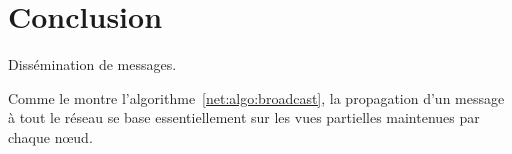 
\section{Conclusion}
\label{net:sec:conclusionspray}

\begin{algorithm}[h]
  
  \caption{\label{net:algo:broadcast} Dissémination de messages.}
\end{algorithm}

Comme le montre l'algorithme~\ref{net:algo:broadcast}, la propagation d'un
message à tout le réseau se base essentiellement sur les vues partielles
maintenues par chaque nœud.
